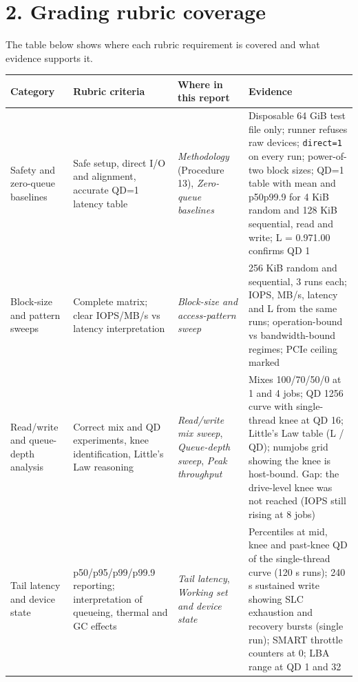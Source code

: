 \documentclass[10pt,letterpaper]{article}
\begin{document}
\par\noindent\begin{minipage}{\linewidth}
\section*{2. Grading rubric coverage}

The table below shows where each rubric requirement is covered and what evidence supports it.


\par\smallskip
{\scriptsize
\noindent\begin{tabular}{>{\raggedright\arraybackslash}p{0.1900\dimexpr\linewidth-8\tabcolsep\relax}>{\raggedright\arraybackslash}p{0.2200\dimexpr\linewidth-8\tabcolsep\relax}>{\raggedright\arraybackslash}p{0.2000\dimexpr\linewidth-8\tabcolsep\relax}>{\raggedright\arraybackslash}p{0.3900\dimexpr\linewidth-8\tabcolsep\relax}}
\toprule
\textbf{Category} & \textbf{Rubric criteria} & \textbf{Where in this report} & \textbf{Evidence} \\ \midrule
Safety and zero-queue baselines & Safe setup, direct I/O and alignment, accurate QD=1 latency table & \emph{Methodology} (Procedure 1\textendash{}3), \emph{Zero-queue baselines} & Disposable 64 GiB test file only; runner refuses raw devices; \texttt{direct=1} on every run; power-of-two block sizes; QD=1 table with mean and p50\textendash{}p99.9 for 4 KiB random and 128 KiB sequential, read and write; L = 0.97\textendash{}1.00 confirms QD 1 \\
Block-size and pattern sweeps & Complete matrix; clear IOPS/MB/s vs latency interpretation & \emph{Block-size and access-pattern sweep} & 4\textendash{}256 KiB \texttimes{} random and sequential, 3 runs each; IOPS, MB/s, latency and L from the same runs; operation-bound vs bandwidth-bound regimes; PCIe ceiling marked \\
Read/write and queue-depth analysis & Correct mix and QD experiments, knee identification, Little's Law reasoning & \emph{Read/write mix sweep}, \emph{Queue-depth sweep}, \emph{Peak throughput} & Mixes 100/70/50/0 at 1 and 4 jobs; QD 1\textendash{}256 curve with single-thread knee at QD 16; Little's Law table (L / QD); numjobs grid showing the knee is host-bound. Gap: the drive-level knee was not reached (IOPS still rising at 8 jobs) \\
Tail latency and device state & p50/p95/p99/p99.9 reporting; interpretation of queueing, thermal and GC effects & \emph{Tail latency}, \emph{Working set and device state} & Percentiles at mid, knee and past-knee QD of the single-thread curve (120 s runs); 240 s sustained write showing SLC exhaustion and recovery bursts (single run); SMART throttle counters at 0; LBA range at QD 1 and 32 \\

\end{tabular}}
\end{minipage}
\end{document}
